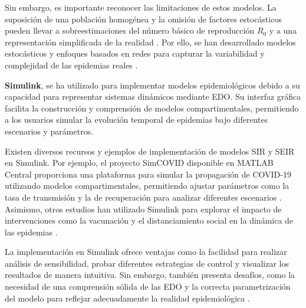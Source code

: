 Sin embargo, es importante reconocer las limitaciones de estos modelos. La suposición de una población homogénea y la omisión de factores estocásticos pueden llevar a sobreestimaciones del número básico de reproducción $R_0$ y a una representación simplificada de la realidad \cite{ali2024deterministic}. Por ello, se han desarrollado modelos estocásticos y enfoques basados en redes para capturar la variabilidad y complejidad de las epidemias reales \cite{islam2020integer}.


\textbf{Simulink}, se ha utilizado para implementar modelos epidemiológicos debido a su capacidad para representar sistemas dinámicos mediante EDO. Su interfaz gráfica facilita la construcción y comprensión de modelos compartimentales, permitiendo a los usuarios simular la evolución temporal de epidemias bajo diferentes escenarios y parámetros.

Existen diversos recursos y ejemplos de implementación de modelos SIR y SEIR en Simulink. Por ejemplo, el proyecto SimCOVID disponible en MATLAB Central proporciona una plataforma para simular la propagación de COVID-19 utilizando modelos compartimentales, permitiendo ajustar parámetros como la tasa de transmisión y la de recuperación para analizar diferentes escenarios \cite{abdulrahman_simcovid_2020}. Asimismo, otros estudios han utilizado Simulink para explorar el impacto de intervenciones como la vacunación y el distanciamiento social en la dinámica de las epidemias \cite{valentini2020sir}.

La implementación en Simulink ofrece ventajas como la facilidad para realizar análisis de sensibilidad, probar diferentes estrategias de control y visualizar los resultados de manera intuitiva. Sin embargo, también presenta desafíos, como la necesidad de una comprensión sólida de las EDO y la correcta parametrización del modelo para reflejar adecuadamente la realidad epidemiológica \cite{wang2020global}.






















